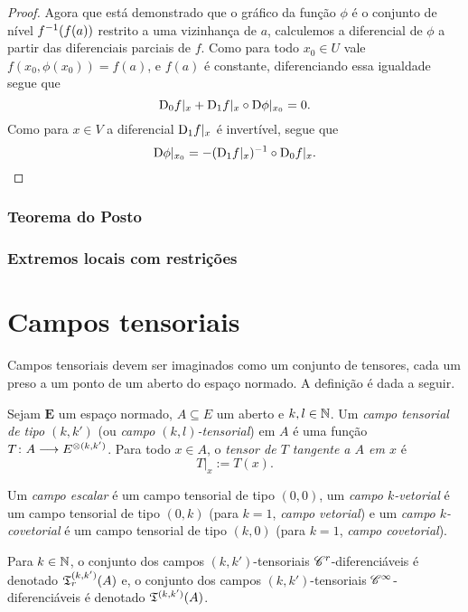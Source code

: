 \begin{proof}
Agora que está demonstrado que o gráfico da função $\phi$ é o conjunto de nível $f^{-1}(f(a))$ restrito a uma vizinhança de $a$, calculemos a diferencial de $\phi$ a partir das diferenciais parciais de $f$. Como para todo $x_0 \in U$ vale $f(x_0,\phi(x_0)) = f(a)$, e $f(a)$ é constante, diferenciando essa igualdade segue que
	\begin{equation*}
	\mathrm{D}_0 f|_x + \mathrm{D}_1 f|_x \circ \mathrm{D} \phi|_{x_0} = 0.
	\end{equation*}
Como para $x \in V$ a diferencial $\mathrm{D}_1 f|_x$ é invertível, segue que
	\begin{equation*}
	\mathrm{D} \phi|_{x_0} = - (\mathrm{D}_1 f|_x)^{-1} \circ \mathrm{D}_0 f|_x.
	\qedhere
	\end{equation*}
\end{proof}





\subsubsection{Teorema do Posto}





\subsubsection{Extremos locais com restrições}




\section{Campos tensoriais}

Campos tensoriais devem ser imaginados como um conjunto de tensores, cada um preso a um ponto de um aberto do espaço normado. A definição é dada a seguir.

\begin{definition}
	Sejam $\bm E$ um espaço normado, $A \subseteq E$ um aberto e $k,l \in \mathbb{N}$. Um \emph{campo tensorial de tipo $(k,k')$} (ou \emph{campo $(k,l)$-tensorial}) em $A$ é uma função $T\colon \allowbreak A \longrightarrow E^{\otimes(k,k')}$. Para todo $x \in A$, o \emph{tensor de $T$ tangente a $A$ em $x$} é
	\begin{equation*}
		T|_x := T(x).
	\end{equation*}
	
	Um \emph{campo escalar} é um campo tensorial de tipo $(0,0)$, um \emph{campo $k$-vetorial} é um campo tensorial de tipo $(0,k)$ (para $k=1$, \emph{campo vetorial}) e um \emph{campo $k$-covetorial} é  um campo tensorial de tipo $(k,0)$ (para $k=1$, \emph{campo covetorial}).
	
	Para $k \in \mathbb{N}$, o conjunto dos campos $(k,k')$-tensoriais $\mathscr{C}^r$-diferenciáveis é denotado $\mathfrak{T}^{(k,k')}_r(A)$ e, o conjunto dos campos $(k,k')$-tensoriais $\mathscr{C}^\infty$-diferenciáveis é denotado $\mathfrak{T}^{(k,k')}(A)$.
\end{definition}

